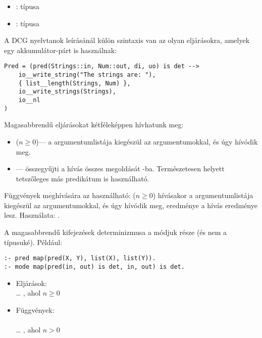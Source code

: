 \begin{itemize}
\item {}:  típusa 
\item {}:  típusa 
\end{itemize}

A DCG nyelvtanok leírásánál külön szintaxis van az olyan eljárásokra, amelyek
egy akkumulátor-párt is használnak:

\begin{verbatim}
Pred = (pred(Strings::in, Num::out, di, uo) is det -->
    io__write_string("The strings are: "),
    { list__length(Strings, Num) },
    io__write_strings(Strings),
    io__nl
)
\end{verbatim}

Magasabbrendű eljárásokat kétféleképpen hívhatunk meg:

\begin{itemize}
\item {} ($n\geq 0$)--- a 
argumentumlistája kiegészül az  argumentumokkal,
és úgy hívódik meg.
\item {} --- összegyűjti a 
hívás összes megoldását -ba. Természetesen  helyett
tetszőleges más predikátum is használható.
\end{itemize}

Függvények meghívására az  használható:
 ($n\geq 0$) hívásakor a 
argumentumlistája kiegészül az  argumentumokkal,
és úgy hívódik meg,  eredménye a hívás eredménye lesz. Használata:
.

A magasabbrendű kifejezések determinizmusa a módjuk része (és nem a típusuké).
Például:

\begin{verbatim}
:- pred map(pred(X, Y), list(X), list(Y)).
:- mode map(pred(in, out) is det, in, out) is det.
\end{verbatim}

\begin{itemize}
\item Eljárások:\\
\cd{,} \dots\cd{,} 
, ahol $n\geq 0$
\item Függvények:\\
   \\
\cd{,} \dots\cd{,} \cd{) =}
  , ahol $n>0$
\end{itemize}

